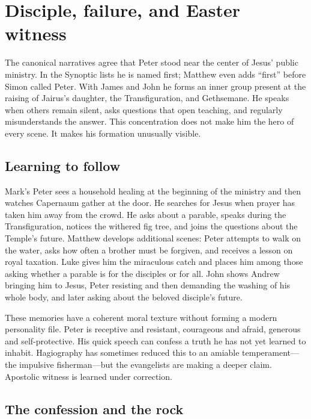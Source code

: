 \section{Disciple, failure, and Easter witness}\label{sec:peter-disciple}

The canonical narratives agree that Peter stood near the center of Jesus'
public ministry. In the Synoptic lists he is named first; Matthew even adds
``first'' before Simon called Peter. With James and John he forms an inner
group present at the raising of Jairus's daughter, the Transfiguration, and
Gethsemane. He speaks when others remain silent, asks questions that open
teaching, and regularly misunderstands the answer. This concentration does
not make him the hero of every scene. It makes his formation unusually
visible.

\subsection{Learning to follow}

Mark's Peter sees a household healing at the beginning of the ministry and
then watches Capernaum gather at the door. He searches for Jesus when prayer
has taken him away from the crowd. He asks about a parable, speaks during the
Transfiguration, notices the withered fig tree, and joins the questions about
the Temple's future. Matthew develops additional scenes: Peter attempts to
walk on the water, asks how often a brother must be forgiven, and receives a
lesson on royal taxation. Luke gives him the miraculous catch and places him
among those asking whether a parable is for the disciples or for all. John
shows Andrew bringing him to Jesus, Peter resisting and then demanding the
washing of his whole body, and later asking about the beloved disciple's
future.

These memories have a coherent moral texture without forming a modern
personality file. Peter is receptive and resistant, courageous and afraid,
generous and self-protective. His quick speech can confess a truth he has not
yet learned to inhabit. Hagiography has sometimes reduced this to an amiable
temperament---the impulsive fisherman---but the evangelists are making a
deeper claim. Apostolic witness is learned under correction.

\subsection{The confession and the rock}

